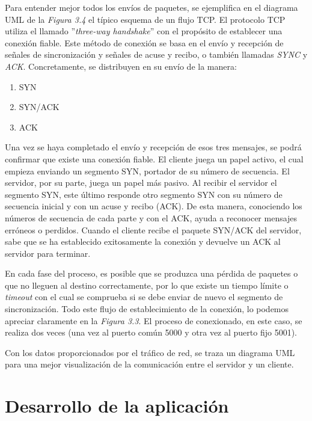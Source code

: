 \documentclass[a4paper,11pt]{book}
\begin{document}
 Para entender mejor todos los envíos de paquetes, se ejemplifica en el diagrama UML de la \textit{Figura 3.4} el típico esquema de un flujo TCP. El protocolo TCP utiliza el llamado ''\textit{three-way handshake}'' con el propósito de establecer una conexión fiable. Este método de conexión se basa en el envío y recepción de señales de sincronización y señales de acuse y recibo, o también llamadas \textit{SYNC} y \textit{ACK}. Concretamente, se distribuyen en su envío de la manera:
 \begin{enumerate}
 \item SYN
 \item SYN/ACK
 \item ACK
 \end{enumerate}
Una vez se haya completado el envío y recepción de esos tres mensajes, se podrá confirmar que existe una conexión fiable. El cliente juega un papel activo, el cual empieza enviando un segmento SYN, portador de su número de secuencia. El servidor, por su parte, juega un papel más pasivo. Al recibir el servidor el segmento SYN, este último responde otro segmento SYN con su número de secuencia inicial y con un acuse y recibo (ACK). De esta manera, conociendo los números de secuencia de cada parte y con el ACK, ayuda a reconocer mensajes erróneos o perdidos. Cuando el cliente recibe el paquete SYN/ACK del servidor, sabe que se ha establecido exitosamente la conexión y devuelve un ACK al servidor para terminar.

En cada fase del proceso, es posible que se produzca una pérdida de paquetes o que no lleguen al destino correctamente, por lo que existe un tiempo límite o \textit{timeout} con el cual se comprueba si se debe enviar de nuevo el segmento de sincronización. Todo este flujo de establecimiento de la conexión, lo podemos apreciar claramente en la \textit{Figura 3.3}. El proceso de conexionado, en este caso, se realiza dos veces (una vez al puerto común 5000 y otra vez al puerto fijo 5001).
			
			
			
			
			
			
			
		
			Con los datos proporcionados por el tráfico de red, se traza un diagrama UML para una mejor visualización de la comunicación entre el servidor y un cliente.
			
			
			
			
\chapter{Desarrollo de la aplicación }
\end{document}
